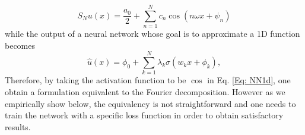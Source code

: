 \documentclass[AMS,STIX1COL]{WileyNJD-v2}
\begin{document}
 \begin{equation}\label{Eq: fourier_shift_1d}
     S_N u(x) = \frac{a_0}{2} + \sum_{n=1}^N c_{n} \cos(n \omega x + \psi_{n})
 \end{equation}
while the output of a neural network whose goal is to approximate a 1D function becomes 
\begin{equation}\label{Eq: NN1d}
  \hat{u}(x) = \phi_0 + \sum_{k = 1}^N \lambda_{k} \sigma\left( w_{k}x + \phi_k \right),
\end{equation}
Therefore, by taking the activation function to be $\cos$ in Eq. \ref{Eq: NN1d}, one obtain a formulation equivalent to the Fourier decomposition. However as we empirically show below, the equivalency is not straightforward and one needs to train the network with a specific loss function in order to obtain satisfactory results.


\end{document}
